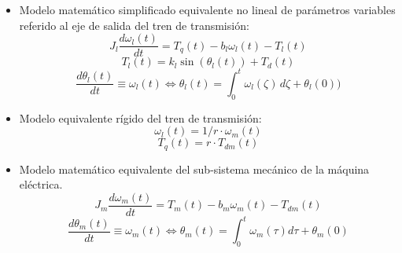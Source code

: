 \documentclass[a4paper, 10pt, onecolumn,journal]{ieeeconf}
\begin{document}
\begin{itemize}
    \item Modelo matemático simplificado equivalente no lineal de parámetros variables referido al eje de salida del tren de transmisión:
    \begin{equation}
        J_l \frac{d\omega_l(t)}{dt} = T_q(t) - b_l \omega_l(t) - T_l(t)
        \label{carga mecanica}
    \end{equation}
    \begin{equation}
        T_l(t) = k_l \sin(\theta_l(t)) + T_d(t)
        \label{torque de carga}
    \end{equation}
    \begin{equation}
        \frac{d\theta_l(t)}{dt} \equiv \omega_l(t) \Leftrightarrow \theta_l(t) = \int_{0}^{t} \omega_l(\zeta) \, d\zeta + \theta_l(0))
        \label{velocidad y posición de la carga}
    \end{equation}

    \item Modelo equivalente rígido del tren de transmisión:
    \begin{equation}
        \omega_l(t) = 1/r \cdot \omega_m(t)
        \label{relacion de velocidad en caja}
    \end{equation}
    \begin{equation}
        T_q(t) = r \cdot T_{dm}(t)
        \label{relacion de torque en caja}
    \end{equation}

    \item Modelo matemático equivalente del sub-sistema mecánico de la máquina eléctrica.
    \begin{equation}
        J_m \frac{d\omega_m(t)}{dt} = T_m(t) - b_m \omega_m(t) - T_{dm}(t)
        \label{subsistema mecanico maquina electrica}
    \end{equation}
    \begin{equation}
        \frac{d\theta_m(t)}{dt} \equiv \omega_m(t) \Leftrightarrow \theta_m(t) = \int_{0}^{t} \omega_m(\tau) d\tau + \theta_m(0)
        \label{posicion y velocidad motor}
    \end{equation}


\end{itemize}
\end{document}
